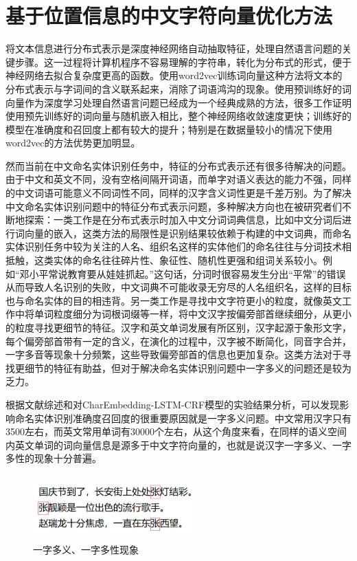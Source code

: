 \documentclass[winfonts,master,oneside,nobackinfo]{njuthesis}
\begin{document}
\section{基于位置信息的中文字符向量优化方法}

将文本信息进行分布式表示是深度神经网络自动抽取特征，处理自然语言问题的关键步骤。这一过程将计算机程序不容易理解的字符串，转化为分布式的形式，便于神经网络去拟合复杂度更高的函数。使用word2vec训练词向量这种方法将文本的分布式表示与字词间的含义联系起来，消除了词语鸿沟的现象。使用预训练好的词向量作为深度学习处理自然语言问题已经成为一个经典成熟的方法，很多工作证明使用预先训练好的词向量与随机嵌入相比，整个神经网络收敛速度更快；训练好的模型在准确度和召回度上都有较大的提升；特别是在数据量较小的情况下使用word2vec的方法优势更加明显。

然而当前在中文命名实体识别任务中，特征的分布式表示还有很多待解决的问题。由于中文和英文不同，没有空格间隔开词语，而单字对语义表达的能力不强，同样的中文词语可能意义不同词性不同，同样的汉字含义词性更是千差万别。为了解决中文命名实体识别问题中的特征分布式表示问题，多种解决方向也在被研究者们不断地探索：一类工作是在分布式表示时加入中文分词词典信息，比如中文分词后进行词向量的嵌入，这类方法的局限性是识别结果较依赖于构建的中文词典，而命名实体识别任务中较为关注的人名、组织名这样的实体他们的命名往往与分词技术相抵触，这类实体的命名往往碎片性、象征性、随机性更强和组词关系较小。例如“邓小平常说教育要从娃娃抓起。”这句话，分词时很容易发生分出“平常”的错误从而导致人名识别的失败，中文词典不可能收录无穷尽的人名组织名，这样的目标也与命名实体的目的相违背。另一类工作是寻找中文字符更小的粒度，就像英文工作中将单词粒度细分为词根词缀等一样，将中文汉字按偏旁部首继续细分，从更小的粒度寻找更细节的特征。汉字和英文单词发展有所区别，汉字起源于象形文字，每个偏旁部首带有一定的含义，在演化的过程中，汉字被不断简化，同音字合并，一字多音等现象十分频繁，这些导致偏旁部首的信息也更加复杂。这类方法对于寻找更细节的特征有助益，但对于解决命名实体识别问题中一字多义的问题还是较为乏力。

根据文献综述和对CharEmbedding-LSTM-CRF模型的实验结果分析，可以发现影响命名实体识别准确度召回度的很重要原因就是一字多义问题。中文常用汉字只有3500左右，而英文常用单词有30000个左右，从这个角度来看，在同样的语义空间内英文单词的词向量信息是源多于中文字符向量的，也就是说汉字一字多义、一字多性的现象十分普遍。

\begin{figure}[ht]
\centering
\begin{minipage}[t]{\textwidth}
\includegraphics[width=0.55\textwidth,height=2.5cm]{./figure/一字多义.jpg}
\caption{一字多义、一字多性现象}
\label{lab:1}
\end{minipage}
\end{figure}
\end{document}
